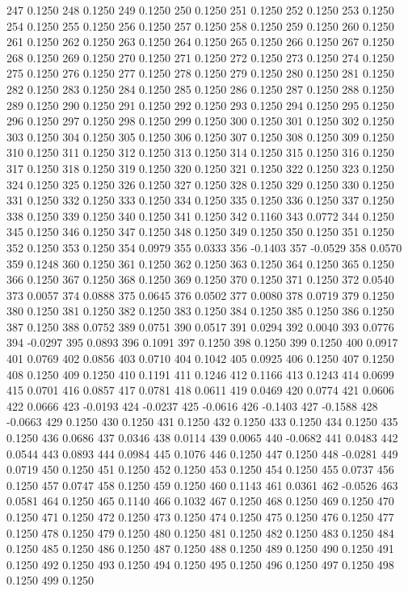247 0.1250
248 0.1250
249 0.1250
250 0.1250
251 0.1250
252 0.1250
253 0.1250
254 0.1250
255 0.1250
256 0.1250
257 0.1250
258 0.1250
259 0.1250
260 0.1250
261 0.1250
262 0.1250
263 0.1250
264 0.1250
265 0.1250
266 0.1250
267 0.1250
268 0.1250
269 0.1250
270 0.1250
271 0.1250
272 0.1250
273 0.1250
274 0.1250
275 0.1250
276 0.1250
277 0.1250
278 0.1250
279 0.1250
280 0.1250
281 0.1250
282 0.1250
283 0.1250
284 0.1250
285 0.1250
286 0.1250
287 0.1250
288 0.1250
289 0.1250
290 0.1250
291 0.1250
292 0.1250
293 0.1250
294 0.1250
295 0.1250
296 0.1250
297 0.1250
298 0.1250
299 0.1250
300 0.1250
301 0.1250
302 0.1250
303 0.1250
304 0.1250
305 0.1250
306 0.1250
307 0.1250
308 0.1250
309 0.1250
310 0.1250
311 0.1250
312 0.1250
313 0.1250
314 0.1250
315 0.1250
316 0.1250
317 0.1250
318 0.1250
319 0.1250
320 0.1250
321 0.1250
322 0.1250
323 0.1250
324 0.1250
325 0.1250
326 0.1250
327 0.1250
328 0.1250
329 0.1250
330 0.1250
331 0.1250
332 0.1250
333 0.1250
334 0.1250
335 0.1250
336 0.1250
337 0.1250
338 0.1250
339 0.1250
340 0.1250
341 0.1250
342 0.1160
343 0.0772
344 0.1250
345 0.1250
346 0.1250
347 0.1250
348 0.1250
349 0.1250
350 0.1250
351 0.1250
352 0.1250
353 0.1250
354 0.0979
355 0.0333
356 -0.1403
357 -0.0529
358 0.0570
359 0.1248
360 0.1250
361 0.1250
362 0.1250
363 0.1250
364 0.1250
365 0.1250
366 0.1250
367 0.1250
368 0.1250
369 0.1250
370 0.1250
371 0.1250
372 0.0540
373 0.0057
374 0.0888
375 0.0645
376 0.0502
377 0.0080
378 0.0719
379 0.1250
380 0.1250
381 0.1250
382 0.1250
383 0.1250
384 0.1250
385 0.1250
386 0.1250
387 0.1250
388 0.0752
389 0.0751
390 0.0517
391 0.0294
392 0.0040
393 0.0776
394 -0.0297
395 0.0893
396 0.1091
397 0.1250
398 0.1250
399 0.1250
400 0.0917
401 0.0769
402 0.0856
403 0.0710
404 0.1042
405 0.0925
406 0.1250
407 0.1250
408 0.1250
409 0.1250
410 0.1191
411 0.1246
412 0.1166
413 0.1243
414 0.0699
415 0.0701
416 0.0857
417 0.0781
418 0.0611
419 0.0469
420 0.0774
421 0.0606
422 0.0666
423 -0.0193
424 -0.0237
425 -0.0616
426 -0.1403
427 -0.1588
428 -0.0663
429 0.1250
430 0.1250
431 0.1250
432 0.1250
433 0.1250
434 0.1250
435 0.1250
436 0.0686
437 0.0346
438 0.0114
439 0.0065
440 -0.0682
441 0.0483
442 0.0544
443 0.0893
444 0.0984
445 0.1076
446 0.1250
447 0.1250
448 -0.0281
449 0.0719
450 0.1250
451 0.1250
452 0.1250
453 0.1250
454 0.1250
455 0.0737
456 0.1250
457 0.0747
458 0.1250
459 0.1250
460 0.1143
461 0.0361
462 -0.0526
463 0.0581
464 0.1250
465 0.1140
466 0.1032
467 0.1250
468 0.1250
469 0.1250
470 0.1250
471 0.1250
472 0.1250
473 0.1250
474 0.1250
475 0.1250
476 0.1250
477 0.1250
478 0.1250
479 0.1250
480 0.1250
481 0.1250
482 0.1250
483 0.1250
484 0.1250
485 0.1250
486 0.1250
487 0.1250
488 0.1250
489 0.1250
490 0.1250
491 0.1250
492 0.1250
493 0.1250
494 0.1250
495 0.1250
496 0.1250
497 0.1250
498 0.1250
499 0.1250
